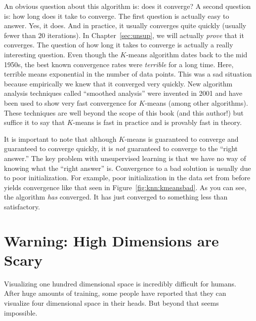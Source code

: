 An obvious question about this algorithm is: does it converge?  A
second question is: how long does it take to converge.  The first
question is actually easy to answer.  Yes, it does.  And in practice,
it usually converges quite quickly (usually fewer than $20$
iterations).  In Chapter~\ref{sec:unsup}, we will actually
\emph{prove} that it converges.  The question of how long it takes to
converge is actually a really interesting question.  Even though the
$K$-means algorithm dates back to the mid 1950s, the best known
convergence rates were \emph{terrible} for a long time.  Here,
terrible means exponential in the number of data points.  This was a
sad situation because empirically we knew that it converged very
quickly.  New algorithm analysis techniques called ``smoothed
analysis'' were invented in 2001 and have been used to show very fast
convergence for $K$-means (among other algorithms).  These techniques
are well beyond the scope of this book (and this author!) but suffice
it to say that $K$-means is fast in practice and is provably fast in
theory.


It is important to note that although $K$-means is guaranteed to
converge and guaranteed to converge quickly, it is \emph{not}
guaranteed to converge to the ``right answer.''  The key problem with
unsupervised learning is that we have no way of knowing what the
``right answer'' is.  Convergence to a bad solution is usually due to
poor initialization.  For example, poor initialization in the data set
from before yields convergence like that seen in
Figure~\ref{fig:knn:kmeansbad}.  As you can see, the algorithm
\emph{has} converged.  It has just converged to something less than
satisfactory.


\section{Warning: High Dimensions are Scary}

Visualizing one hundred dimensional space is incredibly difficult for
humans.  After huge amounts of training, some people have reported
that they can visualize four dimensional space in their heads.  But
beyond that seems impossible.

